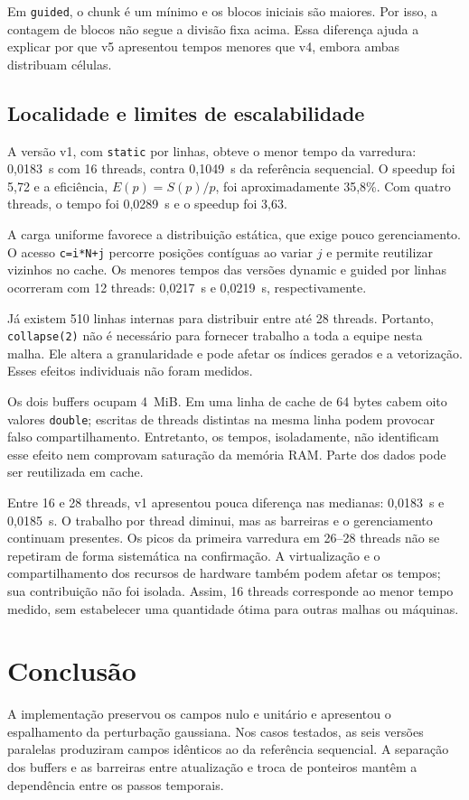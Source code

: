\documentclass[11pt,letterpaper]{article}
\begin{document}
Em \texttt{guided}, o chunk é um mínimo e os blocos iniciais são maiores. Por isso, a contagem de blocos não segue a divisão fixa acima. Essa diferença ajuda a explicar por que v5 apresentou tempos menores que v4, embora ambas distribuam células.

\subsection{Localidade e limites de escalabilidade}
A versão v1, com \texttt{static} por linhas, obteve o menor tempo da varredura: 0,0183~s com 16 threads, contra 0,1049~s da referência sequencial. O speedup foi 5,72 e a eficiência, $E(p)=S(p)/p$, foi aproximadamente 35,8\%. Com quatro threads, o tempo foi 0,0289~s e o speedup foi 3,63.

A carga uniforme favorece a distribuição estática, que exige pouco gerenciamento. O acesso \texttt{c=i*N+j} percorre posições contíguas ao variar $j$ e permite reutilizar vizinhos no cache. Os menores tempos das versões dynamic e guided por linhas ocorreram com 12 threads: 0,0217~s e 0,0219~s, respectivamente.

Já existem 510 linhas internas para distribuir entre até 28 threads. Portanto, \texttt{collapse(2)} não é necessário para fornecer trabalho a toda a equipe nesta malha. Ele altera a granularidade e pode afetar os índices gerados e a vetorização. Esses efeitos individuais não foram medidos.

Os dois buffers ocupam 4~MiB. Em uma linha de cache de 64 bytes cabem oito valores \texttt{double}; escritas de threads distintas na mesma linha podem provocar falso compartilhamento. Entretanto, os tempos, isoladamente, não identificam esse efeito nem comprovam saturação da memória RAM. Parte dos dados pode ser reutilizada em cache.

Entre 16 e 28 threads, v1 apresentou pouca diferença nas medianas: 0,0183~s e 0,0185~s. O trabalho por thread diminui, mas as barreiras e o gerenciamento continuam presentes. Os picos da primeira varredura em 26--28 threads não se repetiram de forma sistemática na confirmação. A virtualização e o compartilhamento dos recursos de hardware também podem afetar os tempos; sua contribuição não foi isolada. Assim, 16 threads corresponde ao menor tempo medido, sem estabelecer uma quantidade ótima para outras malhas ou máquinas.

\section{Conclusão}
A implementação preservou os campos nulo e unitário e apresentou o espalhamento da perturbação gaussiana. Nos casos testados, as seis versões paralelas produziram campos idênticos ao da referência sequencial. A separação dos buffers e as barreiras entre atualização e troca de ponteiros mantêm a dependência entre os passos temporais.
\end{document}
